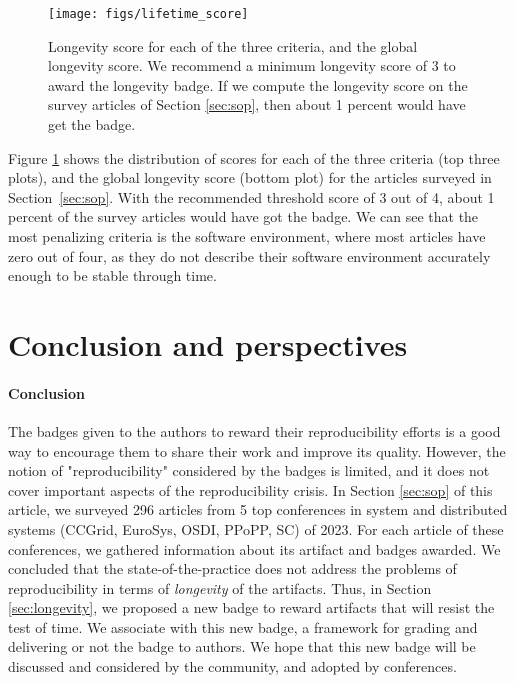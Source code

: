 \documentclass[sigconf,natbib=false]{acmart}
\newcommand{\todo}[1]{{\color{red}{TODO: #1}}}
\begin{document}
\begin{figure}
  \centering
    \texttt{[image: figs/lifetime\_score]}
  \caption{Longevity score for each of the three criteria, and the global longevity score.
  We recommend a minimum longevity score of 3 to award the longevity badge.
  If we compute the longevity score on the survey articles of Section \ref{sec:sop}, then about 1 percent would have get the badge.}\label{fig:longevity_score}
\end{figure}

Figure \ref{fig:longevity_score} shows the distribution of scores for each of the three criteria (top three plots), and the global longevity score (bottom plot) for the articles surveyed in Section\ \ref{sec:sop}.
With the recommended threshold score of 3 out of 4, about 1 percent of the survey articles would have got the badge.
We can see that the most penalizing criteria is the software environment, where most articles have zero out of four, as they do not describe their software environment accurately enough to be stable through time.




\section{Conclusion and perspectives}\label{sec:conclu}

\paragraph{Conclusion}

The badges given to the authors to reward their reproducibility efforts is a good way to encourage them to share their work and improve its quality.
However, the notion of "reproducibility" considered by the badges is limited, and it does not cover important aspects of the reproducibility crisis.
In Section \ref{sec:sop} of this article, we surveyed 296 articles from 5 top conferences in system and distributed systems (CCGrid, EuroSys, OSDI, PPoPP, SC) of 2023.
For each article of these conferences, we gathered information about its artifact and badges awarded.
We concluded that the state-of-the-practice does not address the problems of reproducibility in terms of \emph{longevity} of the artifacts.
Thus, in Section \ref{sec:longevity}, we proposed a new badge to reward artifacts that will resist the test of time.
We associate with this new badge, a framework for grading and delivering or not the badge to authors.
We hope that this new badge will be discussed and considered by the community, and adopted by conferences.%
\end{document}
